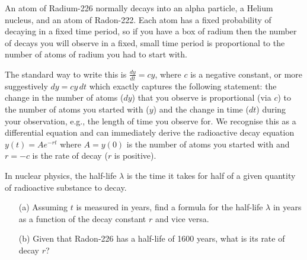 \documentclass[11pt,a4paper]{scrartcl}
\begin{document}
\begin{enumerate}
	An atom of Radium-226 normally decays into an alpha particle,
        a Helium nucleus, and an atom of Radon-222. Each atom has a
        fixed probability of decaying in a fixed time period, so if
        you have a box of radium then the number of decays you will
        observe in a fixed, small time period is proportional to the
        number of atoms of radium you had to start with.
	
	The standard way to write this is $\frac{dy}{dt} = cy$, where
        $c$ is a negative constant, or more suggestively $dy = cy\,dt$
        which exactly captures the following statement: the change in
        the number of atoms ($dy$) that you observe is proportional
        (via $c$) to the number of atoms you started with ($y$) and
        the change in time ($dt$) during your observation, e.g., the
        length of time you observe for.  We recognise this as a
        differential equation and can immediately derive the
        radioactive decay equation $y(t) = Ae^{-rt}$ where $A = y(0)$
        is the number of atoms you started with and $r = -c$ is the
        rate of decay ($r$ is positive).
	
	In nuclear physics, the half-life $\lambda$ is the time it
        takes for half of a given quantity of radioactive substance to
        decay.
	
	\begin{itemize}
		\item[(a)] Assuming $t$ is measured in years, find a
                  formula for the half-life $\lambda$ in years as a
                  function of the decay constant $r$ and vice versa.
		\item[(b)] Given that Radon-226 has a half-life of
                  1600 years, what is its rate of decay $r$?
	\end{itemize}		


\end{enumerate}
\end{document}
